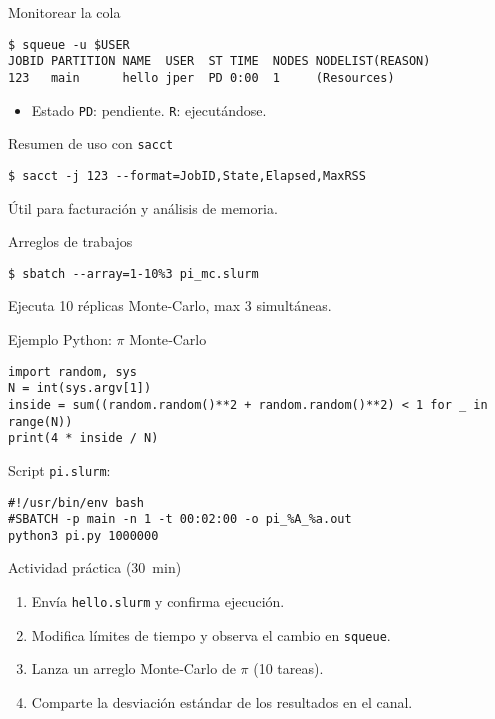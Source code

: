 \documentclass[aspectratio=169,professionalfonts]{beamer}
\begin{document}
\begin{frame}[fragile]{Monitorear la cola}
  \begin{verbatim}
$ squeue -u $USER
JOBID PARTITION NAME  USER  ST TIME  NODES NODELIST(REASON)
123   main      hello jper  PD 0:00  1     (Resources)
  \end{verbatim}
  \begin{itemize}
    \item Estado \texttt{PD}: pendiente. \texttt{R}: ejecutándose.
  \end{itemize}
\end{frame}

\begin{frame}[fragile]{Resumen de uso con \texttt{sacct}}
  \begin{verbatim}
$ sacct -j 123 --format=JobID,State,Elapsed,MaxRSS
  \end{verbatim}
  Útil para facturación y análisis de memoria.
\end{frame}

\begin{frame}[fragile]{Arreglos de trabajos}
  \begin{verbatim}
$ sbatch --array=1-10%3 pi_mc.slurm
  \end{verbatim}
  Ejecuta 10 réplicas Monte‑Carlo, max 3 simultáneas.
\end{frame}

\begin{frame}[fragile]{Ejemplo Python: \(\pi\) Monte‑Carlo}
  \begin{verbatim}
import random, sys
N = int(sys.argv[1])
inside = sum((random.random()**2 + random.random()**2) < 1 for _ in range(N))
print(4 * inside / N)
  \end{verbatim}
  Script \texttt{pi.slurm}:
  \begin{verbatim}
#!/usr/bin/env bash
#SBATCH -p main -n 1 -t 00:02:00 -o pi_%A_%a.out
python3 pi.py 1000000
  \end{verbatim}
\end{frame}

\begin{frame}[fragile]{Actividad práctica (30 min)}
  \begin{enumerate}
    \item Envía \texttt{hello.slurm} y confirma ejecución.
    \item Modifica límites de tiempo y observa el cambio en \texttt{squeue}.
    \item Lanza un arreglo Monte‑Carlo de \(\pi\) (10 tareas).
    \item Comparte la desviación estándar de los resultados en el canal.
  \end{enumerate}
\end{frame}
\end{document}
